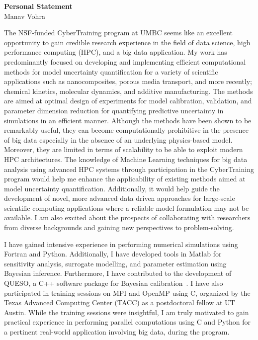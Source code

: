 \documentclass[11pt]{article}
\begin{document}
\thispagestyle{empty}

\begin{center}
\Large{\textbf{Personal Statement}}\\ \vspace{2mm}
\normalsize Manav Vohra
\end{center}

The NSF-funded CyberTraining program at UMBC seems like an excellent opportunity to gain credible
research experience in the field of data science, high performance computing (HPC), and a big data application.
My work has predominantly focused on 
developing and implementing efficient computational methods for model uncertainty quantification for a variety of 
scientific applications such as nanocomposites, porous media transport, and more recently; chemical kinetics, 
molecular dynamics, and additive manufacturing. The methods are aimed at optimal design of experiments
for model calibration,
validation, and parameter dimension reduction for quantifying predictive uncertainty in simulations
in an efficient manner. Although the methods have been shown to be remarkably useful, they can become 
computationally prohibitive in the presence of big data especially in the absence of an underlying physics-based
model. Moreover, they are limited in terms of scalability to be able to exploit modern HPC architectures.
The knowledge of Machine Learning techniques for big data analysis using advanced
HPC systems through participation in the CyberTraining program would help me enhance the applicability
of existing methods aimed at model uncertainty quantification. Additionally, it would help guide the
development of novel, more advanced data driven approaches for large-scale scientific computing
applications where a reliable model formulation may not be available. I am also excited about the 
prospects of collaborating with researchers from diverse backgrounds and gaining
new perspectives to problem-solving. 

I have gained intensive experience in performing numerical simulations using Fortran and Python. Additionally,
I have developed tools in Matlab for sensitivity analysis, surrogate modelling, and parameter estimation using
Bayesian inference. Furthermore, I have contributed to the development of QUESO, a C++ software package
for Bayesian calibration~\cite{Estacio:2016}. I have also participated in training sessions on MPI and OpenMP
using C, organized by the Texas Advanced Computing Center (TACC) as a postdoctoral fellow at UT Austin. 
While the training sessions were insightful, I am truly motivated to gain practical experience in 
performing parallel computations using C and Python for a pertinent real-world application involving big data,
during the program. 
\end{document}
